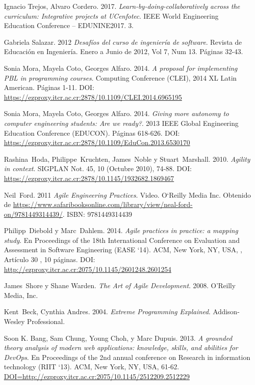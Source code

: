 \begin{thebibliography}{99}
Ignacio Trejos, Alvaro Cordero. 2017. \emph{Learn-by-doing-collaboratively across the curriculum: Integrative projects at UCenfotec}. IEEE World Engineering Education Conference – EDUNINE2017. 3.

Gabriela Salazar. 2012 \emph{Desafíos del curso de ingeniería de software}. Revista de Educación en Ingeniería. Enero a Junio de 2012, Vol 7, Num 13. Páginas 32-43.

Sonia Mora, Mayela Coto, Georges Alfaro. 2014. \emph{A proposal for implementing PBL in programming courses}. Computing Conference (CLEI), 2014 XL Latin American. Páginas 1-11. DOI: \url{https://ezproxy.itcr.ac.cr:2878/10.1109/CLEI.2014.6965195}

Sonia Mora, Mayela Coto, Georges Alfaro. 2014. \emph{Giving more autonomy to computer engineering students: Are we ready?}. 2013 IEEE Global Engineering Education Conference (EDUCON). Páginas 618-626. DOI: \url{https://ezproxy.itcr.ac.cr:2878/10.1109/EduCon.2013.6530170}


Rashina~Hoda, Philippe~Kruchten, James~Noble y Stuart~Marshall. 2010. \emph{Agility in context}. SIGPLAN Not. 45, 10 (Octubre 2010), 74-88. DOI: \url{https://ezproxy.itcr.ac.cr:2878/10.1145/1932682.1869467}

Neil~Ford. 2011 \emph{Agile Engineering Practices}. Video. O`Reilly Media Inc. Obtenido de \url{https://www.safaribooksonline.com/library/view/neal-ford-on/9781449314439/}. ISBN: 9781449314439

Philipp~Diebold y Marc~Dahlem. 2014. \emph{Agile practices in practice: a mapping study}. En Proceedings of the 18th International Conference on Evaluation and Assessment in Software Engineering (EASE `14). ACM, New York, NY, USA, , Artículo 30 , 10 páginas. DOI: \url{http://ezproxy.itcr.ac.cr:2075/10.1145/2601248.2601254}

James~Shore y Shane Warden. \emph{The Art of Agile Development}. 2008. O'Reilly Media, Inc.

Kent~Beck, Cynthia Andres. 2004. \emph{Extreme Programming Explained}. Addison-Wesley Professional.

Soon K. Bang, Sam Chung, Young Choh, y Marc Dupuis. 2013. \emph{A grounded theory analysis of modern web applications: knowledge, skills, and abilities for DevOps}. En Proceedings of the 2nd annual conference on Research in information technology (RIIT `13). ACM, New York, NY, USA, 61-62. \url{DOI=http://ezproxy.itcr.ac.cr:2075/10.1145/2512209.2512229}


\end{thebibliography}
